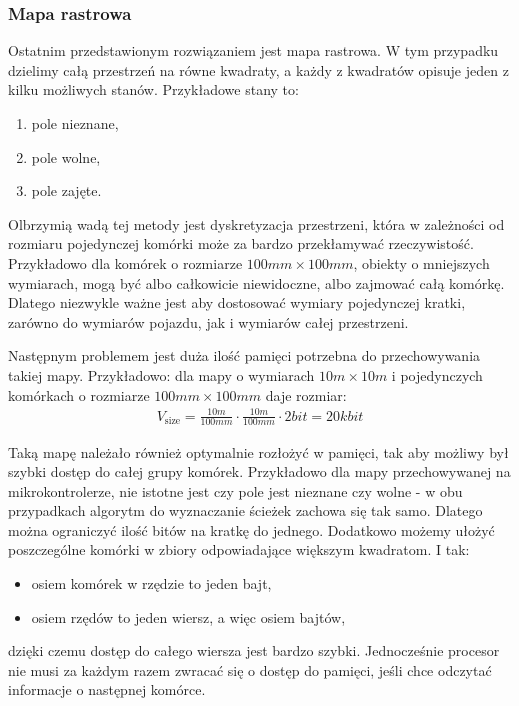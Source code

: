 \newpage
        \subsubsection{Mapa rastrowa}
            Ostatnim przedstawionym rozwiązaniem jest mapa rastrowa.
            W tym przypadku dzielimy całą przestrzeń na równe kwadraty, a każdy z kwadratów opisuje jeden z kilku możliwych stanów.
            Przykładowe stany to:
            \begin{enumerate}
                \item pole nieznane,
                \item pole wolne,
                \item pole zajęte.
            \end{enumerate}

            Olbrzymią wadą tej metody jest dyskretyzacja przestrzeni, która w zależności od rozmiaru pojedynczej komórki może za bardzo przekłamywać rzeczywistość.
            Przykładowo dla komórek o rozmiarze $100mm \times 100mm$, obiekty o mniejszych wymiarach, mogą być albo całkowicie niewidoczne, albo zajmować całą komórkę.
            Dlatego niezwykle ważne jest aby dostosować wymiary pojedynczej kratki, zarówno do wymiarów pojazdu, jak i wymiarów całej przestrzeni.

            Następnym problemem jest duża ilość pamięci potrzebna do przechowywania takiej mapy.
            Przykładowo: dla mapy o wymiarach $10m \times 10m$ i pojedynczych komórkach o rozmiarze $100mm \times 100mm$ daje rozmiar:
            \begin{gather}
                V_{\text{size}} = \frac{10m}{100mm} \cdot \frac{10m}{100mm} \cdot 2bit = 20kbit
            \end{gather}

            Taką mapę należało również optymalnie rozłożyć w pamięci, tak aby możliwy był szybki dostęp do całej grupy komórek.
            Przykładowo dla mapy przechowywanej na mikrokontrolerze, nie istotne jest czy pole jest nieznane czy wolne - w obu przypadkach algorytm do wyznaczanie ścieżek zachowa się tak samo.
            Dlatego można ograniczyć ilość bitów na kratkę do jednego.
            Dodatkowo możemy ułożyć poszczególne komórki w zbiory odpowiadające większym kwadratom.
            I tak:
            \begin{itemize}[label = -]
                \item osiem komórek w rzędzie to jeden bajt,
                \item osiem rzędów to jeden wiersz, a więc osiem bajtów,
            \end{itemize}
            dzięki czemu dostęp do całego wiersza jest bardzo szybki.
            Jednocześnie procesor nie musi za każdym razem zwracać się o dostęp do pamięci, jeśli chce odczytać informacje o następnej komórce.


